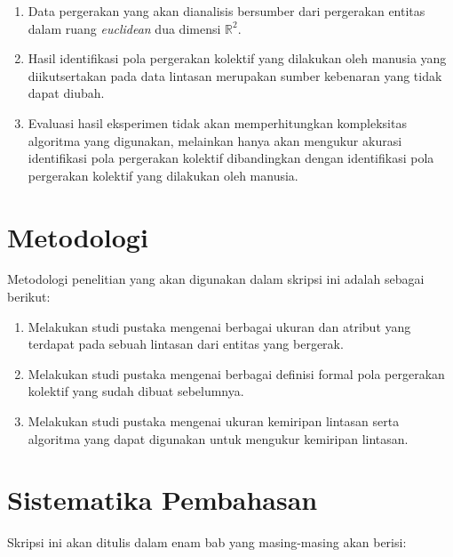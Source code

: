 \begin{enumerate}
    \item Data pergerakan yang akan dianalisis bersumber dari pergerakan entitas dalam ruang \textit{euclidean} dua dimensi $\mathbb{R}^2$.
    \item Hasil identifikasi pola pergerakan kolektif yang dilakukan oleh manusia yang diikutsertakan pada data lintasan merupakan sumber kebenaran yang tidak dapat diubah.
    \item Evaluasi hasil eksperimen tidak akan memperhitungkan kompleksitas algoritma yang digunakan, melainkan hanya akan mengukur akurasi identifikasi pola pergerakan kolektif dibandingkan dengan identifikasi pola pergerakan kolektif yang dilakukan oleh manusia.
\end{enumerate}

\section{Metodologi}
\label{sec:metlit}

Metodologi penelitian yang akan digunakan dalam skripsi ini adalah sebagai berikut:

\begin{enumerate}
    \item Melakukan studi pustaka mengenai berbagai ukuran dan atribut yang terdapat pada sebuah lintasan dari entitas yang bergerak.
    \item Melakukan studi pustaka mengenai berbagai definisi formal pola pergerakan kolektif yang sudah dibuat sebelumnya.
    \item Melakukan studi pustaka mengenai ukuran kemiripan lintasan serta algoritma yang dapat digunakan untuk mengukur kemiripan lintasan.
\end{enumerate}

\section{Sistematika Pembahasan}
\label{sec:sispem}

Skripsi ini akan ditulis dalam enam bab yang masing-masing akan berisi:

